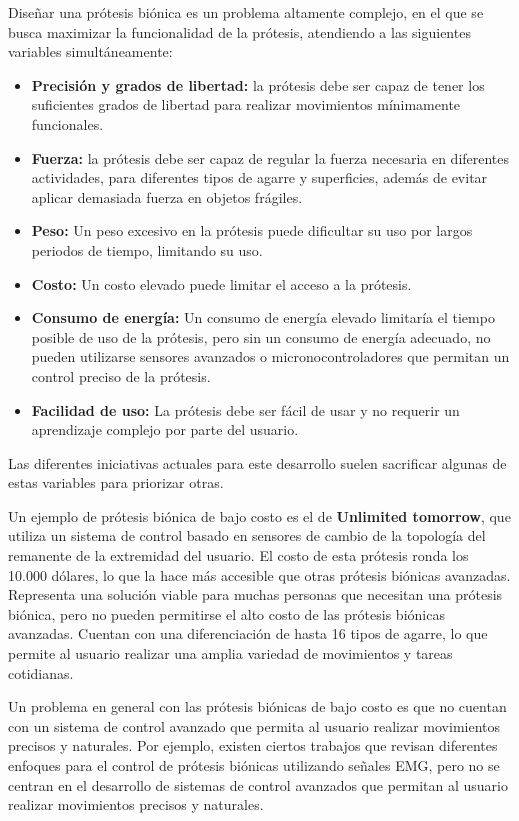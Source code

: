 Diseñar una prótesis biónica es un problema altamente complejo, en el que se busca maximizar la funcionalidad de la prótesis, atendiendo a las siguientes variables simultáneamente:
\begin{itemize}
    \item \textbf{Precisión y grados de libertad:} la prótesis debe ser capaz de tener los suficientes grados de libertad para realizar movimientos mínimamente funcionales.
    \item \textbf{Fuerza:} la prótesis debe ser capaz de regular la fuerza necesaria en diferentes actividades, para diferentes tipos de agarre y superficies, además de evitar aplicar demasiada fuerza en objetos frágiles. 
    \item \textbf{Peso:} Un peso excesivo en la prótesis puede dificultar su uso por largos periodos de tiempo, limitando su uso.
    \item \textbf{Costo:} Un costo elevado puede limitar el acceso a la prótesis.
    \item \textbf{Consumo de energía:} Un consumo de energía elevado limitaría el tiempo posible de uso de la prótesis, pero sin un consumo de energía adecuado, no pueden utilizarse sensores avanzados o micronocontroladores que permitan un control preciso de la prótesis.
    \item \textbf{Facilidad de uso:} La prótesis debe ser fácil de usar y no requerir un aprendizaje complejo por parte del usuario.
\end{itemize}

Las diferentes iniciativas actuales para este desarrollo suelen sacrificar algunas de estas variables para priorizar otras.

Un ejemplo de prótesis biónica de bajo costo es el de \textbf{Unlimited tomorrow}, que utiliza un sistema de control basado en sensores de cambio de la topología del remanente de la extremidad del usuario. El costo de esta prótesis ronda los 10.000 dólares, lo que la hace más accesible que otras prótesis biónicas avanzadas. Representa una solución viable para muchas personas que necesitan una prótesis biónica, pero no pueden permitirse el alto costo de las prótesis biónicas avanzadas. Cuentan con una diferenciación de hasta 16 tipos de agarre, lo que permite al usuario realizar una amplia variedad de movimientos y tareas cotidianas.

Un problema en general con las prótesis biónicas de bajo costo es que no cuentan con un sistema de control avanzado que permita al usuario realizar movimientos precisos y naturales. Por ejemplo, existen ciertos trabajos  \citep{emgcontrolled} que revisan diferentes enfoques para el control de prótesis biónicas utilizando señales EMG, pero no se centran en el desarrollo de sistemas de control avanzados que permitan al usuario realizar movimientos precisos y naturales.

